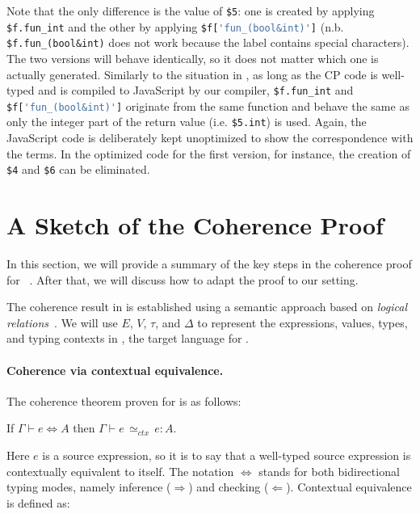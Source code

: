 \noindent
Note that the only difference is the value of \lstinline{$5}: one is created by
applying \lstinline{$f.fun_int} and the other by applying
\lstinline[language=TypeScript]{$f['fun_(bool&int)']}
(n.b. \lstinline{$f.fun_(bool&int)} does not work because the label contains
special characters). The two versions will behave identically, so it does not
matter which one is actually generated. Similarly to the situation in \lambdar,
as long as the CP code is well-typed and is compiled to JavaScript by our
compiler, \lstinline{$f.fun_int} and
\lstinline[language=TypeScript]{$f['fun_(bool&int)']} originate from the same
function and behave the same as only the integer part of the return value  (i.e.
\lstinline{$5.int}) is used. Again, the JavaScript code is deliberately kept
unoptimized to show the correspondence with the \lambdar terms. In the optimized
code for the first version, for instance, the creation of \lstinline{$4} and
\lstinline{$6} can be eliminated.

\section{A Sketch of the Coherence Proof} \label{sec:coherence}

In this section, we will provide a summary of the key steps in the coherence
proof for \necolus~\citep{bi2018essence}. After that, we will discuss how to
adapt the proof to our setting.

The coherence result in \necolus is established using a semantic approach based
on \emph{logical relations}~\citep{tait1967intensional,biernacki2015logical}.
We will use $E$, $V$, $\tau$, and $\Delta$ to represent the expressions, values, types, and
typing contexts in \lambdac, the target language for \necolus.

\paragraph{Coherence via contextual equivalence.}
The coherence theorem proven for \necolus is as follows:

\begin{theorem}\label{thm:coherence}
If $\Gamma \vdash e \Leftrightarrow A$
then $\Gamma \vdash e \, {\simeq}_\mathit{ctx} \, e : A$.
\end{theorem}

\noindent
Here $e$ is a source expression, so it is to say that a well-typed source
expression is contextually equivalent to itself. The notation $\Leftrightarrow$
stands for both bidirectional typing modes, namely inference ($\Rightarrow$) and
checking ($\Leftarrow$). Contextual equivalence is defined as:

